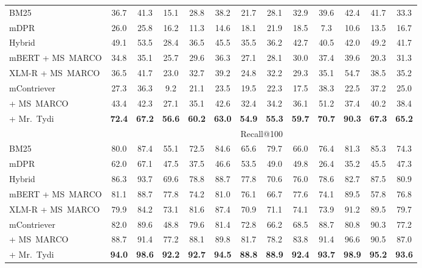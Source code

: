 \documentclass[10pt]{article} %
\def \oursmulti          {mContriever}
\begin{document}
\begin{table}[t!]
{\begin{tabular}{l cccccccccccc}
    BM25~\citep{zhang2021mrtydi} & 36.7 &	41.3 &	15.1 &	28.8 &	38.2 &	21.7 &	28.1 &	32.9 &	39.6 &	42.4 &	41.7 &	33.3 \\
    mDPR~\citep{zhang2021mrtydi} & 26.0 & 	25.8 & 	16.2 &	11.3 &	14.6 &	18.1 &	21.9 &	18.5 &	7.3 &	10.6 &	13.5 &	16.7 \\
    Hybrid~\citep{zhang2021mrtydi} & 49.1 &	53.5 &	28.4 &	 36.5 &	 45.5 &	35.5 &	36.2 &	42.7 &	40.5 &	42.0 &	49.2 &	41.7 \\
    mBERT + MS~MARCO & 34.8 &  35.1 &	25.7 &	29.6 &	36.3 &	27.1 &	28.1 &	30.0 &	37.4 &	39.6 &	20.3 &	31.3 \\
    XLM-R + MS~MARCO & 36.5	&  41.7	& 23.0 & 	32.7 &	39.2 &	24.8 &	32.2 &	29.3 &	35.1 &	54.7 &	38.5 & 35.2 \\
    \rowcolor{bluegrey}
    \oursmulti{} & 27.3 & 36.3 &	9.2  &	21.1 &	23.5 &	19.5 &	22.3 &	17.5 &	38.3 & 22.5 & 37.2 & 25.0\\
    \rowcolor{bluegrey} + MS~MARCO  & 43.4 & 42.3 &	27.1 &	35.1 &	42.6 &	32.4 &	34.2 &	36.1 &	51.2 & 37.4 &  40.2 & 38.4 \\
    \rowcolor{bluegrey} + Mr.~Tydi  & \bf 72.4 &	\bf 67.2 &	\bf 56.6 &	\bf 60.2 &	\bf 63.0 &	\bf 54.9 &	\bf 55.3 &	\bf 59.7 &	\bf 70.7 &	\bf 90.3 &	\bf 67.3 &	\bf 65.2 \\
    \midrule
    & \multicolumn{12}{c}{Recall@100} \\
    \midrule
    BM25~\citep{zhang2021mrtydi} & 80.0 &	87.4 &	55.1 &	72.5 &	84.6 &	65.6 &	79.7 &	66.0 &	76.4 &	81.3 &	85.3 & 74.3 \\
    mDPR~\citep{zhang2021mrtydi} & 62.0 & 	67.1 &	47.5 &	37.5 &	46.6 &	53.5 &	49.0 &	49.8 &	26.4 &	35.2 &	45.5 & 47.3 \\
    Hybrid~\citep{zhang2021mrtydi} & 86.3 &	93.7 &	69.6 &	78.8 &	88.7 &	77.8 &	70.6 &	76.0 &	78.6 &	82.7 &	87.5 & 80.9 \\ 
    mBERT + MS~MARCO & 81.1	& 88.7 & 77.8 & 74.2 & 81.0 & 76.1 & 66.7 & 77.6 & 74.1 &	89.5 & 57.8 & 76.8 \\
    XLM-R + MS~MARCO & 79.9	& 84.2 &	73.1 &	81.6 &	87.4 &	70.9 &	71.1 &	74.1 &	73.9 &	91.2 &	89.5 &	79.7 \\
    \rowcolor{bluegrey}
    \oursmulti{}              & 82.0 &	89.6 &	48.8 &	79.6 &	81.4 &	72.8 &	66.2 &	68.5 &	88.7 &	80.8 &	90.3 & 77.2 \\
    \rowcolor{bluegrey} + MS~MARCO  & 88.7 &    91.4 &	77.2 &	88.1 &	89.8 &	81.7 &	78.2 &	83.8 &	91.4 &	96.6 &	90.5 & 87.0 \\
    \rowcolor{bluegrey} + Mr.~Tydi  & \bf 94.0 &	\bf 98.6 &	\bf 92.2 &	\bf 92.7 &	\bf 94.5 &	\bf 88.8 &	\bf 88.9 &	\bf 92.4 &	\bf 93.7 &	\bf 98.9 &	\bf 95.2 & \bf 93.6 \\
    \bottomrule
  \end{tabular}}
\end{table}
\end{document}

